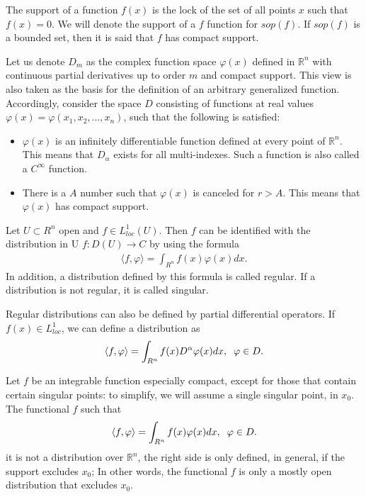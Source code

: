 	\begin{definition}
		The support of a function $f(x)$ is the lock of the set of all points $x$ such that $f(x) = 0$. We will denote the support of a $f$ function for $sop(f)$. If $sop(f)$ is a bounded set, then it is said that $f$ has compact support. 
	\end{definition}
	
	Let us denote $D_m$ as the complex function space $\varphi(x)$ defined in $\mathbb{R}^n$ with continuous partial derivatives up to order $m$ and compact support. This view is also taken as the basis for the definition of an arbitrary generalized function. Accordingly, consider the space $D$ consisting of functions at real values $\varphi(x) = \varphi(x_1, x_2, \dots, x_n)$, such that the following is satisfied:
	\begin{itemize}
		\item 
		$\varphi(x)$ is an infinitely differentiable function defined at every point of $\mathbb{R}^n$. This means that $D_{\alpha}$ exists for all multi-indexes. Such a function is also called a $C^{\infty}$ function.
		\item 
		There is a $A$ number such that $\varphi(x)$ is canceled for $r > A$. This means that $\varphi(x)$ has compact support.
	\end{itemize}
	
	\begin{teor}
		Let $U \subset R^n$ open and $f \in L^1_{loc} (U)$. Then $f$ can be identified with the distribution in U $f: D (U) \rightarrow C$ by using the formula
		\begin{align*}
			\langle f, \varphi \rangle = \displaystyle \int_{R^n} f(x) \varphi (x) dx.
		\end{align*}
		In addition, a distribution defined by this formula is called regular. If a distribution is not regular, it is called singular.
	\end{teor}
	
	Regular distributions can also be defined by partial differential operators. If $f(x) \in L^1_{loc}$, we can define a distribution as
	\begin{align*}
		\langle f, \varphi \rangle = \displaystyle \int_{R^n} f(x) D^{\alpha} \varphi (x) dx, \hspace{2mm} \varphi \in D.
	\end{align*}

	Let $f$ be an integrable function especially compact, except for those that contain certain singular points: to simplify, we will assume a single singular point, in $x_0$. The functional $f$ such that
	\begin{align*}
		\langle f, \varphi \rangle = \displaystyle \int_{R^n} f(x) \varphi (x) dx, \hspace{2mm} \varphi \in D.
	\end{align*}
	it is not a distribution over $\mathbb{R}^n$, the right side is only defined, in general, if the support excludes $x_0$; In other words, the functional $f$ is only a mostly open distribution that excludes $x_0$.
	
